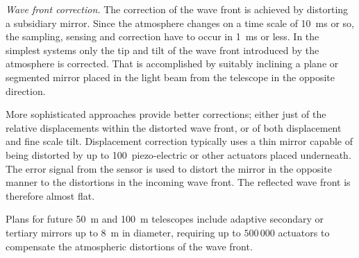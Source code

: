 \noindent
{\it Wave front correction.} The correction of the wave front is achieved
by distorting a subsidiary mirror. Since the atmosphere changes on a time
scale of 10~ms or so, the sampling, sensing and correction have to occur in
1~ms or less. In the simplest systems only the tip and tilt of the wave
front introduced by the atmosphere is corrected. That is accomplished by 
suitably inclining a plane or segmented mirror placed in the light beam
from the telescope in the opposite direction. 

More sophisticated approaches provide better corrections; either just
of the relative displacements within the distorted wave front, or of both
displacement and fine scale tilt. Displacement correction typically uses
a thin mirror capable of being distorted by up to 100~piezo-electric or other
actuators placed underneath. The error signal from the sensor is used to
distort the mirror in the opposite manner to the distortions in the incoming
wave front. The reflected wave front is therefore almost flat.

Plans for future 50~m and 100~m telescopes include adaptive secondary or
tertiary mirrors up to 8~m in diameter, requiring up to $500\,000$ actuators
to compensate the atmospheric distortions of the wave front.

